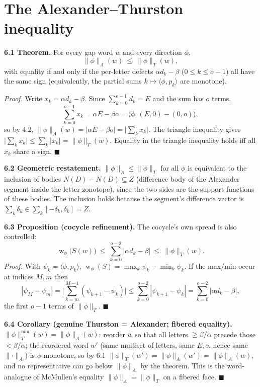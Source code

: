 \documentclass[11pt]{article}
\begin{document}
\section{The Alexander--Thurston inequality}

\textbf{6.1 Theorem.} For every gap word $w$ and every direction $\phi$,
\[
\lVert\phi\rVert_{A}(w)\ \le\ \lVert\phi\rVert_{T}(w),
\]
with equality if and only if the per-letter defects $\alpha d_k-\beta$
($0\le k\le o-1$) all have the same sign (equivalently, the partial sums
$k\mapsto\langle\phi,p_k\rangle$ are monotone).

\medskip
\emph{Proof.} Write $x_k=\alpha d_k-\beta$. Since $\sum_{k=0}^{o-1}d_k=E$ and the sum
has $o$ terms,
\[
\sum_{k=0}^{o-1}x_k=\alpha E-\beta o=\langle\phi,(E,0)-(0,o)\rangle,
\]
so by 4.2, $\lVert\phi\rVert_A(w)=|\alpha E-\beta o|=\big|\sum_{k}x_k\big|$. The
triangle inequality gives $\big|\sum_k x_k\big|\le\sum_k|x_k|=\lVert\phi\rVert_T(w)$.
Equality in the triangle inequality holds iff all $x_k$ share a sign. \hfill$\blacksquare$

\medskip
\textbf{6.2 Geometric restatement.} $\lVert\phi\rVert_A\le\lVert\phi\rVert_T$ for all
$\phi$ is equivalent to the inclusion of bodies $N(D)-N(D)\subseteq Z$ (difference body
of the Alexander segment inside the letter zonotope), since the two sides are the
support functions of these bodies. The inclusion holds because the segment's difference
vector is $\sum_k\delta_k\in\sum_k[-\delta_k,\delta_k]=Z$.

\medskip
\textbf{6.3 Proposition (cocycle refinement).} The cocycle's own spread is also
controlled:
\[
\operatorname{w}_\phi\big(S(w)\big)\ \le\ \sum_{k=0}^{o-2}|\alpha d_k-\beta|\ \le\ \lVert\phi\rVert_T(w).
\]
\emph{Proof.} With $\psi_k=\langle\phi,p_k\rangle$,
$\operatorname{w}_\phi(S)=\max_k\psi_k-\min_k\psi_k$. If the max/min occur at indices
$M,m$ then
\[
|\psi_M-\psi_m|=\Big|\sum_{k=m}^{M-1}(\psi_{k+1}-\psi_k)\Big|
\le\sum_{k=0}^{o-2}|\psi_{k+1}-\psi_k|=\sum_{k=0}^{o-2}|\alpha d_k-\beta|,
\]
the first $o-1$ terms of $\lVert\phi\rVert_T$. \hfill$\blacksquare$

\medskip
\textbf{6.4 Corollary (genuine Thurston = Alexander; fibered equality).}
$\lVert\phi\rVert_T^{\min}(w)=\lVert\phi\rVert_A(w)$: reorder $w$ so that all letters
$\ge\beta/\alpha$ precede those $<\beta/\alpha$; the reordered word $w'$ (same multiset
of letters, same $E,o$, hence same $\lVert\cdot\rVert_A$) is $\phi$-monotone, so by 6.1
$\lVert\phi\rVert_T(w')=\lVert\phi\rVert_A(w')=\lVert\phi\rVert_A(w)$, and no
representative can go below $\lVert\phi\rVert_A$ by the theorem. This is the
word-analogue of McMullen's equality $\lVert\phi\rVert_A=\lVert\phi\rVert_T$ on a
fibered face. \hfill$\blacksquare$
\end{document}
